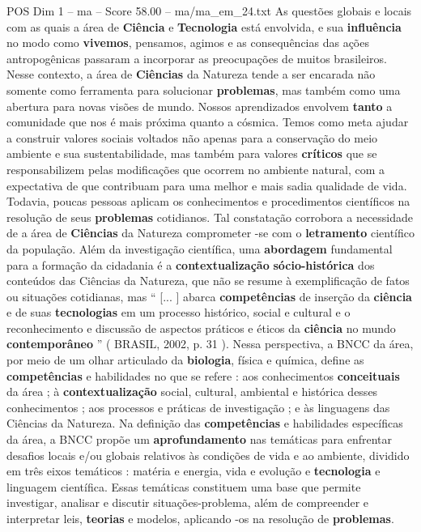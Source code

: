 \begin{textsample}{POS Dim 1 – ma – Score 58.00 – ma/ma\_em\_24.txt}
As questões globais e locais com as quais a área de \textbf{Ciência} e \textbf{Tecnologia} está envolvida, e sua \textbf{influência} no modo como \textbf{vivemos}, pensamos, agimos e as consequências das ações antropogênicas passaram a incorporar as preocupações de muitos brasileiros.
Nesse contexto, a área de \textbf{Ciências} da Natureza tende a ser encarada não somente como ferramenta para solucionar \textbf{problemas}, mas também como uma abertura para novas visões de mundo.
Nossos aprendizados envolvem \textbf{tanto} a comunidade que nos é mais próxima quanto a cósmica.
Temos como meta ajudar a construir valores sociais voltados não apenas para a conservação do meio ambiente e sua sustentabilidade, mas também para valores \textbf{críticos} que se responsabilizem pelas modificações que ocorrem no ambiente natural, com a expectativa de que contribuam para uma melhor e mais sadia qualidade de vida.
Todavia, poucas pessoas aplicam os conhecimentos e procedimentos científicos na resolução de seus \textbf{problemas} cotidianos.
Tal constatação corrobora a necessidade de a área de \textbf{Ciências} da Natureza comprometer -se com o \textbf{letramento} científico da população.
Além da investigação científica, uma \textbf{abordagem} fundamental para a formação da cidadania é a \textbf{contextualização} \textbf{sócio-histórica} dos conteúdos das Ciências da Natureza, que não se resume à exemplificação de fatos ou situações cotidianas, mas “ [... ] abarca \textbf{competências} de inserção da \textbf{ciência} e de suas \textbf{tecnologias} em um processo histórico, social e cultural e o reconhecimento e discussão de aspectos práticos e éticos da \textbf{ciência} no mundo \textbf{contemporâneo} ” ( BRASIL, 2002, p. 31 ).
Nessa perspectiva, a BNCC da área, por meio de um olhar articulado da \textbf{biologia}, física e química, define as \textbf{competências} e habilidades no que se refere : aos conhecimentos \textbf{conceituais} da área ; à \textbf{contextualização} social, cultural, ambiental e histórica desses conhecimentos ; aos processos e práticas de investigação ; e às linguagens das Ciências da Natureza.
Na definição das \textbf{competências} e habilidades específicas da área, a BNCC propõe um \textbf{aprofundamento} nas temáticas para enfrentar desafios locais e/ou globais relativos às condições de vida e ao ambiente, dividido em três eixos temáticos : matéria e energia, vida e evolução e \textbf{tecnologia} e linguagem científica.
Essas temáticas constituem uma base que permite investigar, analisar e discutir situações-problema, além de compreender e interpretar leis, \textbf{teorias} e modelos, aplicando -os na resolução de \textbf{problemas}.

\end{textsample}
